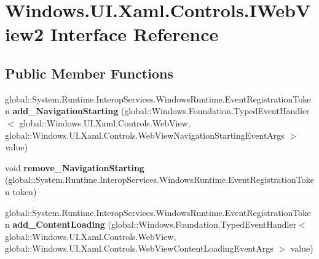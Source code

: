 \hypertarget{interface_windows_1_1_u_i_1_1_xaml_1_1_controls_1_1_i_web_view2}{}\section{Windows.\+U\+I.\+Xaml.\+Controls.\+I\+Web\+View2 Interface Reference}
\label{interface_windows_1_1_u_i_1_1_xaml_1_1_controls_1_1_i_web_view2}
\subsection*{Public Member Functions}
\begin{DoxyCompactItemize}
\item 
\mbox{\label{interface_windows_1_1_u_i_1_1_xaml_1_1_controls_1_1_i_web_view2_a23045b54a3bab5196d47fc172fd18d87}} 
global\+::\+System.\+Runtime.\+Interop\+Services.\+Windows\+Runtime.\+Event\+Registration\+Token {\bfseries add\+\_\+\+Navigation\+Starting} (global\+::\+Windows.\+Foundation.\+Typed\+Event\+Handler$<$ global\+::\+Windows.\+U\+I.\+Xaml.\+Controls.\+Web\+View, global\+::\+Windows.\+U\+I.\+Xaml.\+Controls.\+Web\+View\+Navigation\+Starting\+Event\+Args $>$ value)
\item 
\mbox{\label{interface_windows_1_1_u_i_1_1_xaml_1_1_controls_1_1_i_web_view2_a669f35cd29b2d8961a6c132444a73ddf}} 
void {\bfseries remove\+\_\+\+Navigation\+Starting} (global\+::\+System.\+Runtime.\+Interop\+Services.\+Windows\+Runtime.\+Event\+Registration\+Token token)
\item 
\mbox{\label{interface_windows_1_1_u_i_1_1_xaml_1_1_controls_1_1_i_web_view2_abc203b6881b1b76a4b7672b7fb427bda}} 
global\+::\+System.\+Runtime.\+Interop\+Services.\+Windows\+Runtime.\+Event\+Registration\+Token {\bfseries add\+\_\+\+Content\+Loading} (global\+::\+Windows.\+Foundation.\+Typed\+Event\+Handler$<$ global\+::\+Windows.\+U\+I.\+Xaml.\+Controls.\+Web\+View, global\+::\+Windows.\+U\+I.\+Xaml.\+Controls.\+Web\+View\+Content\+Loading\+Event\+Args $>$ value)
\item 
\mbox{\label{interface_windows_1_1_u_i_1_1_xaml_1_1_controls_1_1_i_web_view2_ae842c5ef69d1e7a4cea4c4e546878fc0}} 

\end{DoxyCompactItemize}
